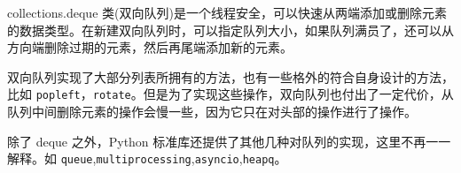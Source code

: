 collections.deque 类(双向队列)是一个线程安全，可以快速从两端添加或删除元素的数据类型。在新建双向队列时，可以指定队列大小，如果队列满员了，还可以从方向端删除过期的元素，然后再尾端添加新的元素。



双向队列实现了大部分列表所拥有的方法，也有一些格外的符合自身设计的方法，比如 \texttt{popleft}，\texttt{rotate}。但是为了实现这些操作，双向队列也付出了一定代价，从队列中间删除元素的操作会慢一些，因为它只在对头部的操作进行了操作。

除了 deque 之外，Python 标准库还提供了其他几种对队列的实现，这里不再一一解释。如 \texttt{queue},\texttt{multiprocessing},\texttt{asyncio},\texttt{heapq}。

\newpage